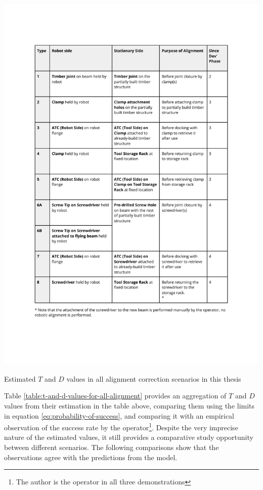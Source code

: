 \begin{table}[h]
    \includegraphics[page=8, trim=25.4mm 100mm 25.4mm 33mm, clip, width=\textwidth]{tables/Tables in Chapter 9 to 11.pdf}
    \caption{Estimated $T$ and $D$ values in all alignment correction scenarios in this thesis}
    \label{table:t-and-d-values-for-all-alignment}
\end{table}
\FloatBarrier

Table \ref{table:t-and-d-values-for-all-alignment} provides an aggregation of $T$ and $D$ values from their estimation in the table above, comparing them using the limits in equation \ref{eq:probability-of-success}, and comparing it with an empirical observation of the success rate by the operator\footnote{The author is the operator in all three demonstrations}. Despite the very imprecise nature of the estimated values, it still provides a comparative study opportunity between different scenarios. The following comparisons show that the observations agree with the predictions from the model.

